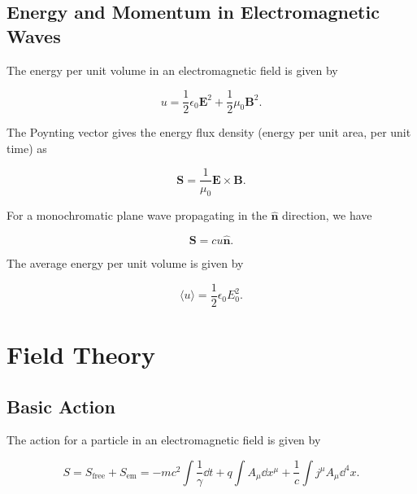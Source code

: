 \documentclass{article}
\numberwithin{equation}{subsection}
\begin{document}
\subsection{Energy and Momentum in Electromagnetic Waves}
The energy per unit volume in an electromagnetic field is given by 
\begin{meq}
    \begin{equation}
        u = \frac{1}{2}\epsilon_0\bm{E}^2 + \frac{1}{2}\mu_0\bm{B}^2.
    \end{equation}
\end{meq}
The Poynting vector gives the energy flux density (energy per unit area, per unit time) as 
\begin{meq}
    \begin{equation}
        \bm{S} = \frac{1}{\mu_0}\bm{E} \times \bm{B}.
    \end{equation}
\end{meq}
For a monochromatic plane wave propagating in the $\hat{\bm{n}}$ direction, we have 
\begin{meq}
    \begin{equation}
        \bm{S} = cu\hat{\bm{n}}.
    \end{equation}
\end{meq}
The average energy per unit volume is given by 
\begin{meq}
    \begin{equation}
        \langle u \rangle = \frac{1}{2}\epsilon_0 E_0^2.
    \end{equation}
\end{meq}
\section{Field Theory}
\subsection{Basic Action}
The action for a particle in an electromagnetic field is given by 
\begin{meq}
    \begin{equation}
        S = S_\text{free} + S_\text{em} = -mc^2\int \frac{1}{\gamma}\dd{t} + q\int A_\mu \dd{x}^\mu + \frac{1}{c}\int j^\mu A_\mu \dd^4x.
    \end{equation}
\end{meq}
\end{document}
